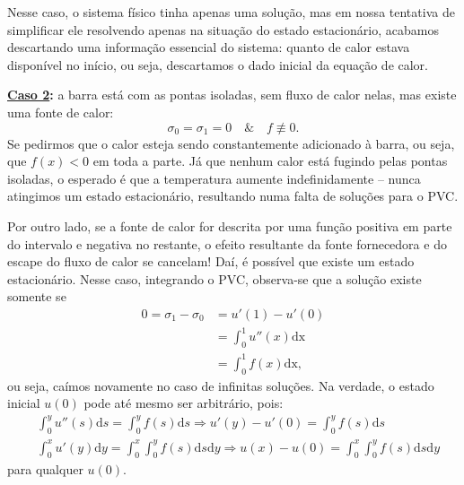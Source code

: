 \documentclass[../differential_methods.tex]{subfiles}
\begin{document}
Nesse caso, o sistema físico tinha apenas uma solução, mas em nossa tentativa de simplificar ele resolvendo apenas na situação do estado estacionário, acabamos descartando uma informação essencial do sistema: quanto de calor estava disponível no início, ou seja, descartamos o dado inicial da equação de calor.

\textbf{\underline{Caso 2}:} a barra está com as pontas isoladas, sem fluxo de calor nelas, mas existe uma fonte de calor:
\[
	\sigma_{0}=\sigma_{1}=0 \quad\&\quad f\not\equiv 0.
\]
Se pedirmos que o calor esteja sendo constantemente adicionado à barra, ou seja, que \(f(x)<0\) em toda a parte. Já que nenhum calor está fugindo pelas pontas isoladas, o esperado é que a temperatura aumente indefinidamente -- nunca atingimos um estado estacionário, resultando numa falta de soluções para o PVC.

Por outro lado, se a fonte de calor for descrita por uma função positiva em parte do intervalo e negativa no restante, o efeito resultante da fonte fornecedora e do escape do fluxo de calor se cancelam! Daí, é possível que existe um estado estacionário. Nesse caso, integrando o PVC, observa-se que a solução existe somente se
\begin{align*}
	0=\sigma_{1}-\sigma_{0} & = u'(1)-u'(0)                    \\
	                        & = \int_{0}^{1}u''(x) \mathrm{dx} \\
	                        & = \int_{0}^{1}f(x) \mathrm{dx},
\end{align*}
ou seja, caímos novamente no caso de infinitas soluções. Na verdade, o estado inicial \(u(0)\) pode até mesmo ser arbitrário, pois:
\begin{align*}
	 & \int_{0}^{y}u''(s) \mathrm{d}s = \int_{0}^{y}f(s) \mathrm{d}s \Rightarrow u'(y)-u'(0)=\int_{0}^{y}f(s) \mathrm{d}s                                             \\
	 & \int_{0}^{x}u'(y) \mathrm{d}y=\int_{0}^{x}\int_{0}^{y}f(s) \mathrm{d}s \mathrm{d}y  \Rightarrow u(x)-u(0)=\int_{0}^{x}\int_{0}^{y}f(s) \mathrm{d}s \mathrm{d}y
\end{align*}
para qualquer \(u(0).\)
\end{document}
